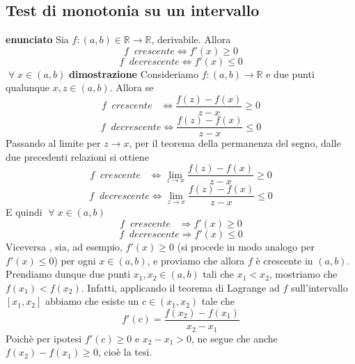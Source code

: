 \documentclass[a4paper, 9pt]{report}
\begin{document}
\newpage
\subsection*{Test di monotonia su un intervallo}
\textbf{enunciato}\newline
Sia $f:(a,b) \in \mathbb{R} \rightarrow \mathbb{R}$, derivabile. Allora
\[
    f \;\; crescente \Longleftrightarrow f'(x)\geq 0
\]
\[
    f \;\; decrescente \Longleftrightarrow  f'(x) \leq 0
\]
$\;\forall\; x \in (a,b)$\newline 
\newline
\textbf{dimostrazione}\newline 
Consideriamo $f: (a,b) \rightarrow \mathbb{R}$ e due punti qualunque $x,z \in (a,b)$. Allora se
\[
    f \;\; crescente \;\;\; \Longleftrightarrow \frac{f(z) - f(x)}{z-x} \geq 0
\]
\[
    f \;\; decrescente \Longleftrightarrow \frac{f(z) - f(x)}{z-x} \leq 0
\]
Passando al limite per $z \rightarrow x$, per il teorema della permanenza del segno, dalle due precedenti relazioni si ottiene
\[
    f \;\; crescente \;\;\; \Longleftrightarrow \lim_{z\rightarrow x}\frac{f(z) - f(x)}{z-x} \geq 0
\]
\[
    f \;\; decrescente \Longleftrightarrow \lim_{z\rightarrow x}\frac{f(z) - f(x)}{z-x} \leq 0
\] 
E quindi $\;\forall\; x \in (a,b)$
\[
    f \;\; crescente \;\;\; \Rightarrow f'(x) \geq 0
\]
\[
    f \;\; decrescente \Rightarrow  f'(x) \leq 0
\]
Viceversa , sia, ad esempio, $f'(x) \geq 0$ (si procede in modo analogo per $f'(x) \leq 0$) per ogni $x \in (a,b)$, e proviamo che allora $f$ è crescente in $(a,b)$. Prendiamo dunque due punti $x_1, x_2 \in (a,b)$ tali che $x_1 < x_2$, mostriamo che $f(x_1) < f(x_2)$. Infatti, applicando il teorema di Lagrange ad $f$ sull'intervallo $[x_1, x_2]$ abbiamo che esiste un $c \in (x_1, x_2)$ tale che
\[
    f'(c) = \frac{f(x_2) - f(x_1)}{x_2 - x_1}
\]
Poichè per ipotesi $f'(c) \geq 0$ e $x_2 - x_1 > 0$, ne segue che anche $f(x_2) - f(x_1) \geq 0$, cioè la tesi.\newline





\newpage
\end{document}
